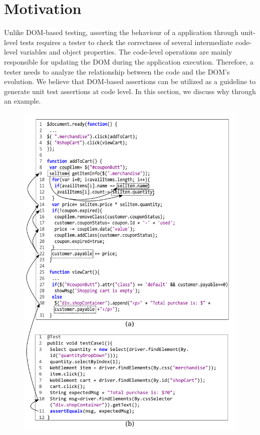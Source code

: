 \section{Motivation} \label{Sec:motivation}

Unlike DOM-based testing, asserting the behaviour of a \javascript application through unit-level tests requires a tester to check the correctness of several intermediate code-level variables and object properties. The code-level operations are mainly responsible for updating the DOM during the application execution. Therefore, a tester needs to analyze the relationship between the \javascript code and the DOM's evolution. 
We believe that DOM-based assertions can be utilized as a guideline to generate unit test assertions at \javascript code level. In this section, we discuss why through an example.


\begin{figure}[!t]
  \centering
  \includegraphics[width=.8\hsize]{fig/example}
  \vspace{0.2in} 
  \label{Fig:example}
\end{figure}


